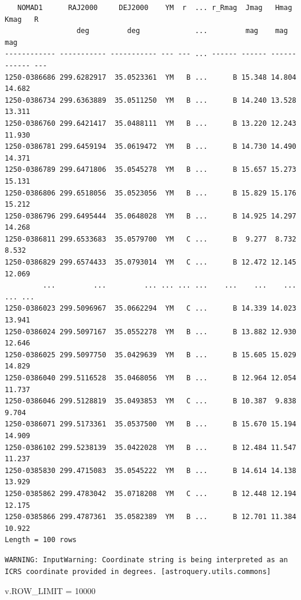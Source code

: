 \documentclass[
  letterpaper,
  DIV=11,
  numbers=noendperiod]{scrreprt}
\newenvironment{Shaded}{\begin{snugshade}}{\end{snugshade}}
\newcommand{\DecValTok}[1]{\textcolor[rgb]{0.68,0.00,0.00}{#1}}
\newcommand{\NormalTok}[1]{\textcolor[rgb]{0.00,0.23,0.31}{#1}}
\newcommand{\OperatorTok}[1]{\textcolor[rgb]{0.37,0.37,0.37}{#1}}
\begin{document}
\begin{verbatim}
   NOMAD1      RAJ2000     DEJ2000    YM  r  ... r_Rmag  Jmag   Hmag   Kmag   R 
                 deg         deg             ...         mag    mag    mag      
------------ ----------- ----------- --- --- ... ------ ------ ------ ------ ---
1250-0386686 299.6282917  35.0523361  YM   B ...      B 15.348 14.804 14.682    
1250-0386734 299.6363889  35.0511250  YM   B ...      B 14.240 13.528 13.311    
1250-0386760 299.6421417  35.0488111  YM   B ...      B 13.220 12.243 11.930    
1250-0386781 299.6459194  35.0619472  YM   B ...      B 14.730 14.490 14.371    
1250-0386789 299.6471806  35.0545278  YM   B ...      B 15.657 15.273 15.131    
1250-0386806 299.6518056  35.0523056  YM   B ...      B 15.829 15.176 15.212    
1250-0386796 299.6495444  35.0648028  YM   B ...      B 14.925 14.297 14.268    
1250-0386811 299.6533683  35.0579700  YM   C ...      B  9.277  8.732  8.532    
1250-0386829 299.6574433  35.0793014  YM   C ...      B 12.472 12.145 12.069    
         ...         ...         ... ... ... ...    ...    ...    ...    ... ...
1250-0386023 299.5096967  35.0662294  YM   C ...      B 14.339 14.023 13.941    
1250-0386024 299.5097167  35.0552278  YM   B ...      B 13.882 12.930 12.646    
1250-0386025 299.5097750  35.0429639  YM   B ...      B 15.605 15.029 14.829    
1250-0386040 299.5116528  35.0468056  YM   B ...      B 12.964 12.054 11.737    
1250-0386046 299.5128819  35.0493853  YM   C ...      B 10.387  9.838  9.704    
1250-0386071 299.5173361  35.0537500  YM   B ...      B 15.670 15.194 14.909    
1250-0386102 299.5238139  35.0422028  YM   B ...      B 12.484 11.547 11.237    
1250-0385830 299.4715083  35.0545222  YM   B ...      B 14.614 14.138 13.929    
1250-0385862 299.4783042  35.0718208  YM   C ...      B 12.448 12.194 12.175    
1250-0385866 299.4787361  35.0582389  YM   B ...      B 12.701 11.384 10.922    
Length = 100 rows
\end{verbatim}

\begin{verbatim}
WARNING: InputWarning: Coordinate string is being interpreted as an ICRS coordinate provided in degrees. [astroquery.utils.commons]
\end{verbatim}

\begin{Shaded}
\begin{Highlighting}[]
\NormalTok{v.ROW\_LIMIT }\OperatorTok{=} \DecValTok{10000}
\end{Highlighting}
\end{Shaded}
\end{document}
